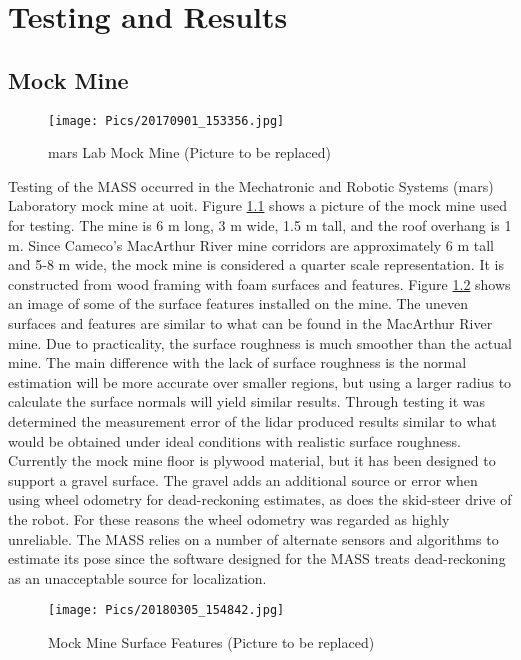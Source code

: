 \chapter{Testing and Results}
\label{chap:testing}

\section{Mock Mine}
\label{sec:mine}
\begin{figure}
    \centering
    \texttt{[image: Pics/20170901\_153356.jpg]}
    \caption{\acrshort{mars} Lab Mock Mine (Picture to be replaced)}
    \label{fig:mockmine}
\end{figure}
Testing of the MASS occurred in the Mechatronic and Robotic Systems (\acrshort{mars}) Laboratory mock mine at \acrshort{uoit}. Figure \ref{fig:mockmine} shows a picture of the mock mine used for testing. The mine is 6 m long, 3 m wide, 1.5 m tall, and the roof overhang is 1 m. Since Cameco's MacArthur River mine corridors are approximately 6 m tall and 5-8 m wide, the mock mine is considered a quarter scale representation. It is constructed from wood framing with foam surfaces and features. Figure \ref{fig:surfacefeature} shows an image of some of the surface features installed on the mine. The uneven surfaces and features are similar to what can be found in the MacArthur River mine. Due to practicality, the surface roughness is much smoother than the actual mine. The main difference with the lack of surface roughness is the normal estimation will be more accurate over smaller regions, but using a larger radius to calculate the surface normals will yield similar results. Through testing it was determined the measurement error of the \acrshort{lidar} produced results similar to what would be obtained under ideal conditions with realistic surface roughness. Currently the mock mine floor is plywood material, but it has been designed to support a gravel surface. The gravel adds an additional source or error when using wheel odometry for dead-reckoning estimates, as does the skid-steer drive of the robot. For these reasons the wheel odometry was regarded as highly unreliable. The MASS relies on a number of alternate sensors and algorithms to estimate its pose since the software designed for the MASS treats dead-reckoning as an unacceptable source for localization.\\
\begin{figure}
    \centering
    \texttt{[image: Pics/20180305\_154842.jpg]}
    \caption{Mock Mine Surface Features (Picture to be replaced)}
    \label{fig:surfacefeature}
\end{figure}
